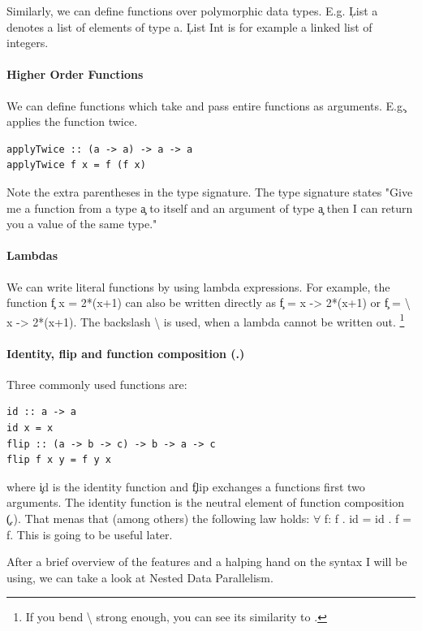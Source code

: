     Similarly, we can define functions over polymorphic data types.
    E.g. \c{List a} denotes a list of elements of type a. \c{List Int}
    is for example a linked list of integers.
  
  \paragraph{Higher Order Functions}
    We can define functions which take and pass entire functions as arguments.
    E.g.\c{} applies the function twice.
    \begin{lstlisting}
applyTwice :: (a -> a) -> a -> a
applyTwice f x = f (f x)
    \end{lstlisting}
    Note the extra parentheses in the type signature. The type signature
    states "Give me a function from a type \c{a} to itself and an
    argument of type \c{a} then I can return you a value of the same type."
    
  \paragraph{Lambdas}
    We can write literal functions by using lambda expressions.
    For example, the function \c{f x = 2*(x+1)} can also be written
    directly as \c{f = \lam x -> 2*(x+1)} or \c{f = \textbackslash{} x -> 2*(x+1)}.
    The backslash \textbackslash{} is used, when a lambda cannot be written out.
    \footnote{If you bend \textbackslash{} strong enough, you can see its similarity to \lam.}
    
  \paragraph{Identity, flip and function composition (.)}
    Three commonly used functions are:
    
    \begin{lstlisting}
id :: a -> a
id x = x
flip :: (a -> b -> c) -> b -> a -> c
flip f x y = f y x
    \end{lstlisting}
    where \c{id} is the identity function and \c{flip} exchanges a functions
    first two arguments.
    The identity function is the neutral element of function composition \c{(.)}.
    That menas that (among others) the following law holds:
     \c{\textrm{$\forall$} f: f . id = id . f = f}. This is going to be useful later.

  After a brief overview of the features and a halping hand on the syntax
  I will be using, we can take a look at Nested Data Parallelism.

